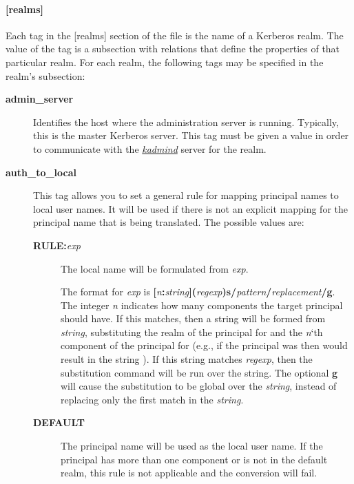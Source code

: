 \documentclass[letterpaper,10pt,english]{sphinxmanual}
\begin{document}
\paragraph{{[}realms{]}}
\label{admin/conf_files/krb5_conf:id2}\label{admin/conf_files/krb5_conf:realms}
Each tag in the {[}realms{]} section of the file is the name of a Kerberos
realm.  The value of the tag is a subsection with relations that
define the properties of that particular realm.  For each realm, the
following tags may be specified in the realm's subsection:
\begin{description}
\item[{\textbf{admin\_server}}] \leavevmode
Identifies the host where the administration server is running.
Typically, this is the master Kerberos server.  This tag must be
given a value in order to communicate with the {\hyperref[admin/admin_commands/kadmind:kadmind-8]{\emph{kadmind}}}
server for the realm.

\item[{\textbf{auth\_to\_local}}] \leavevmode
This tag allows you to set a general rule for mapping principal
names to local user names.  It will be used if there is not an
explicit mapping for the principal name that is being
translated. The possible values are:
\begin{description}
\item[{\textbf{RULE:}\emph{exp}}] \leavevmode
The local name will be formulated from \emph{exp}.

The format for \emph{exp} is \textbf{{[}}\emph{n}\textbf{:}\emph{string}\textbf{{]}(}\emph{regexp}\textbf{)s/}\emph{pattern}\textbf{/}\emph{replacement}\textbf{/g}.
The integer \emph{n} indicates how many components the target
principal should have.  If this matches, then a string will be
formed from \emph{string}, substituting the realm of the principal
for  and the \emph{n}`th component of the principal for
 (e.g., if the principal was  then
\code{{[}2:\$2\$1foo{]}} would result in the string
).  If this string matches \emph{regexp}, then
the  substitution command will be run over the
string.  The optional \textbf{g} will cause the substitution to be
global over the \emph{string}, instead of replacing only the first
match in the \emph{string}.

\item[{\textbf{DEFAULT}}] \leavevmode
The principal name will be used as the local user name.  If
the principal has more than one component or is not in the
default realm, this rule is not applicable and the conversion
will fail.


\end{description}
\end{description}
\end{document}
